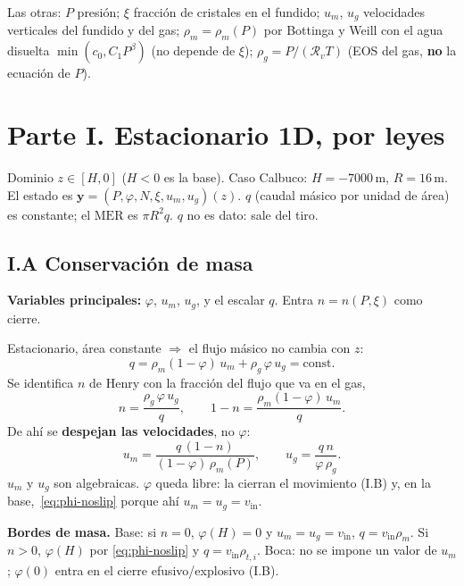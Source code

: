 \documentclass[11pt,a4paper]{article}
\newcommand{\Rv}{\mathcal{R}_v}
\begin{document}
Las otras: $P$ presión; $\xi$ fracción de cristales en el
fundido; $u_m$, $u_g$ velocidades verticales del fundido y del
gas; $\rho_m=\rho_m(P)$ por Bottinga y Weill con el agua
disuelta $\min(c_0,C_1 P^\beta)$ (no depende de $\xi$);
$\rho_g=P/(\Rv T)$ (EOS del gas,
\textbf{no} la ecuación de $P$).

\section*{Parte I. Estacionario 1D, por leyes}

Dominio $z\in[H,0]$ ($H<0$ es la base). Caso Calbuco:
$H=-7000\,\mathrm{m}$, $R=16\,\mathrm{m}$.
El estado es $\mathbf{y}=(P,\varphi,N,\xi,u_m,u_g)(z)$.
$q$ (caudal másico por unidad de área) es constante; el
$\mathrm{MER}$ es $\pi R^2 q$. $q$ no es dato: sale del tiro.

\subsection*{I.A Conservación de masa}

\textbf{Variables principales:} $\varphi$, $u_m$, $u_g$, y el
escalar $q$. Entra $n=n(P,\xi)$ como cierre.

Estacionario, área constante $\Rightarrow$ el flujo másico no
cambia con $z$:
\begin{equation}
\label{eq:q}
q
=\rho_m(1-\varphi)\,u_m
+\rho_g\,\varphi\,u_g
=\mathrm{const}.
\end{equation}
Se identifica $n$ de Henry con la fracción del flujo que va
en el gas,
\begin{equation}
\label{eq:n-flux}
n
=\frac{\rho_g\,\varphi\,u_g}{q},
\qquad
1-n
=\frac{\rho_m(1-\varphi)\,u_m}{q}.
\end{equation}
De ahí se \textbf{despejan las velocidades}, no $\varphi$:
\begin{equation}
\label{eq:vel}
u_m
=\frac{q\,(1-n)}{(1-\varphi)\,\rho_m(P)},
\qquad
u_g
=\frac{q\,n}{\varphi\,\rho_g}.
\end{equation}
$u_m$ y $u_g$ son algebraicas. $\varphi$ queda libre: la
cierran el movimiento (I.B) y, en la base,~\eqref{eq:phi-noslip}
porque ahí $u_m=u_g=v_{\mathrm{in}}$.

\textbf{Bordes de masa.}
Base: si $n=0$, $\varphi(H)=0$ y $u_m=u_g=v_{\mathrm{in}}$,
$q=v_{\mathrm{in}}\rho_m$. Si $n>0$, $\varphi(H)$ por
\eqref{eq:phi-noslip} y $q=v_{\mathrm{in}}\rho_{t,i}$.
Boca: no se impone un valor de $u_m$; $\varphi(0)$ entra en
el cierre efusivo/explosivo (I.B).
\end{document}
